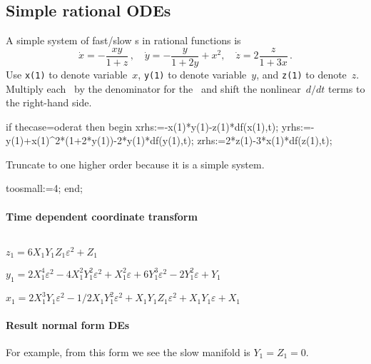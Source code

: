 \documentclass[11pt,a5paper]{article}
\begin{document}
\subsection{Simple rational ODEs}
\label{sec:oderat}

A simple system of fast/slow \ode{}s in rational functions is
\begin{equation}
\dot x=-\frac{xy}{1+z}\,,\quad
\dot y=-\frac y{1+2y}+x^2,\quad
\dot z=2\frac z{1+3x}\,.
\end{equation}
Use \verb|x(1)| to denote variable~$x$, \verb|y(1)| to denote variable~$y$, and \verb|z(1)| to denote~$z$.
Multiply each \ode\ by the denominator for the \ode\ and shift the nonlinear~\(d/dt\) terms to the right-hand side.
\begin{reduce}
if thecase=oderat then begin
xrhs:={-x(1)*y(1)-z(1)*df(x(1),t)};
yrhs:={-y(1)+x(1)^2*(1+2*y(1))-2*y(1)*df(y(1),t)};
zrhs:={2*z(1)-3*x(1)*df(z(1),t)};
\end{reduce}

Truncate to one higher order because it is a simple system.
\begin{reduce}
toosmall:=4;
end;
\end{reduce}

\paragraph{Time dependent coordinate transform}
\begin{math}
\end{math}\par
 
\begin{math}
z_{1}=6 X_{1} Y_{1} Z_{1} \varepsilon ^{2}+Z_{1}
\end{math}\par

\begin{math}
y_{1}=2 X_{1}^{4} \varepsilon ^{2}-4 X_{1}^{2} Y_{1}^{2} \varepsilon ^{2
}+X_{1}^{2} \varepsilon +6 Y_{1}^{3} \varepsilon ^{2}-2 Y_{1}^{2} 
\varepsilon +Y_{1}
\end{math}\par

\begin{math}
x_{1}=2 X_{1}^{3} Y_{1} \varepsilon ^{2}-1/2 X_{1} Y_{1}^{2} 
\varepsilon ^{2}+X_{1} Y_{1} Z_{1} \varepsilon ^{2}+X_{1} Y_{1} 
\varepsilon +X_{1}
\end{math}


\paragraph{Result normal form DEs}
For example, from this form we see the slow manifold is \(Y_1=Z_1=0\).\par
\end{document}
